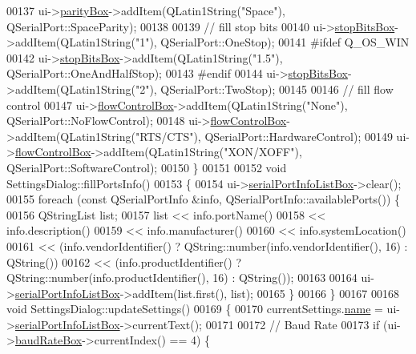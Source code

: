 \begin{DoxyCode}
{{{{{00137     ui->\hyperlink{a00082_a88c0b5d1f96a308ab115937b090f7bba}{parityBox}->addItem(QLatin1String(\textcolor{stringliteral}{"Space"}), QSerialPort::SpaceParity);
00138 
00139     \textcolor{comment}{// fill stop bits}
00140     ui->\hyperlink{a00082_ad61890c5fd0acc9e72385efd02df90c0}{stopBitsBox}->addItem(QLatin1String(\textcolor{stringliteral}{"1"}), QSerialPort::OneStop);
00141 \textcolor{preprocessor}{#ifdef Q\_OS\_WIN}
00142     ui->\hyperlink{a00082_ad61890c5fd0acc9e72385efd02df90c0}{stopBitsBox}->addItem(QLatin1String(\textcolor{stringliteral}{"1.5"}), QSerialPort::OneAndHalfStop);
00143 \textcolor{preprocessor}{#endif}
00144     ui->\hyperlink{a00082_ad61890c5fd0acc9e72385efd02df90c0}{stopBitsBox}->addItem(QLatin1String(\textcolor{stringliteral}{"2"}), QSerialPort::TwoStop);
00145 
00146     \textcolor{comment}{// fill flow control}
00147     ui->\hyperlink{a00082_a1ebdf5da704108eae1078cefc446fbef}{flowControlBox}->addItem(QLatin1String(\textcolor{stringliteral}{"None"}), QSerialPort::NoFlowControl);
00148     ui->\hyperlink{a00082_a1ebdf5da704108eae1078cefc446fbef}{flowControlBox}->addItem(QLatin1String(\textcolor{stringliteral}{"RTS/CTS"}), QSerialPort::HardwareControl);
00149     ui->\hyperlink{a00082_a1ebdf5da704108eae1078cefc446fbef}{flowControlBox}->addItem(QLatin1String(\textcolor{stringliteral}{"XON/XOFF"}), QSerialPort::SoftwareControl);
00150 \}
00151 
00152 \textcolor{keywordtype}{void} SettingsDialog::fillPortsInfo()
00153 \{
00154     ui->\hyperlink{a00082_a323eca0d6d4b94d2d41c7737fe8b2282}{serialPortInfoListBox}->clear();
00155     \textcolor{keywordflow}{foreach} (\textcolor{keyword}{const} QSerialPortInfo &info, QSerialPortInfo::availablePorts()) \{
00156         QStringList list;
00157         list << info.portName()
00158              << info.description()
00159              << info.manufacturer()
00160              << info.systemLocation()
00161              << (info.vendorIdentifier() ? QString::number(info.vendorIdentifier(), 16) : QString())
00162              << (info.productIdentifier() ? QString::number(info.productIdentifier(), 16) : QString());
00163 
00164         ui->\hyperlink{a00082_a323eca0d6d4b94d2d41c7737fe8b2282}{serialPortInfoListBox}->addItem(list.first(), list);
00165     \}
00166 \}
00167 
00168 \textcolor{keywordtype}{void} SettingsDialog::updateSettings()
00169 \{
00170     currentSettings.\hyperlink{a00075_a973c8cfb942a512f34fc4227c0caa6dd}{name} = ui->\hyperlink{a00082_a323eca0d6d4b94d2d41c7737fe8b2282}{serialPortInfoListBox}->currentText();
00171 
00172     \textcolor{comment}{// Baud Rate}
00173     \textcolor{keywordflow}{if} (ui->\hyperlink{a00082_a766a61db4a8c72219543f7c096ae5601}{baudRateBox}->currentIndex() == 4) \{
}}}}}
\end{DoxyCode}

